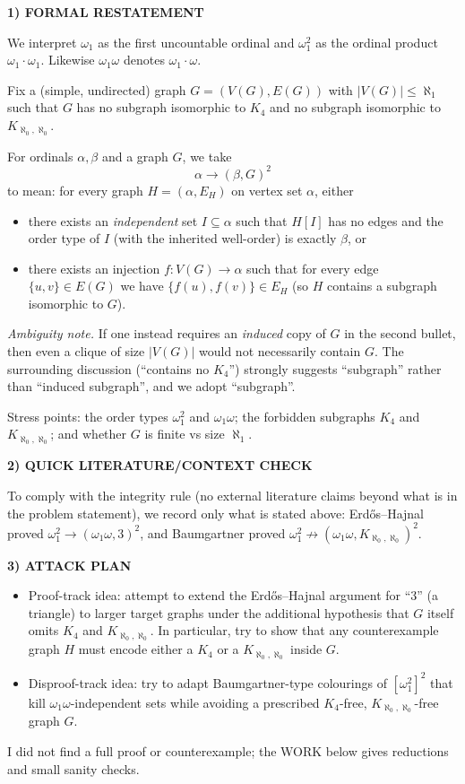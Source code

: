 \noindent\textbf{1) FORMAL RESTATEMENT}\par
We interpret $\omega_1$ as the first uncountable ordinal and $\omega_1^2$ as the ordinal product $\omega_1\cdot\omega_1$. Likewise $\omega_1\omega$ denotes $\omega_1\cdot\omega$.

Fix a (simple, undirected) graph $G=(V(G),E(G))$ with $|V(G)|\le\aleph_1$ such that $G$ has no subgraph isomorphic to $K_4$ and no subgraph isomorphic to $K_{\aleph_0,\aleph_0}$.

For ordinals $\alpha,\beta$ and a graph $G$, we take
\[
\alpha\to(\beta,G)^2
\]
to mean: for every graph $H=(\alpha,E_H)$ on vertex set $\alpha$, either
\begin{itemize}
\item there exists an \emph{independent} set $I\subseteq\alpha$ such that $H[I]$ has no edges and the order type of $I$ (with the inherited well-order) is exactly $\beta$, or
\item there exists an injection $f:V(G)\to\alpha$ such that for every edge $\{u,v\}\in E(G)$ we have $\{f(u),f(v)\}\in E_H$ (so $H$ contains a subgraph isomorphic to $G$).
\end{itemize}

\emph{Ambiguity note.} If one instead requires an \emph{induced} copy of $G$ in the second bullet, then even a clique of size $|V(G)|$ would not necessarily contain $G$. The surrounding discussion (``contains no $K_4$'') strongly suggests ``subgraph'' rather than ``induced subgraph'', and we adopt ``subgraph''.

Stress points: the order types $\omega_1^2$ and $\omega_1\omega$; the forbidden subgraphs $K_4$ and $K_{\aleph_0,\aleph_0}$; and whether $G$ is finite vs size $\aleph_1$.

\noindent\textbf{2) QUICK LITERATURE/CONTEXT CHECK}\par
To comply with the integrity rule (no external literature claims beyond what is in the problem statement), we record only what is stated above: Erd\H{o}s--Hajnal proved $\omega_1^2\to(\omega_1\omega,3)^2$, and Baumgartner proved $\omega_1^2\not\to(\omega_1\omega,K_{\aleph_0,\aleph_0})^2$.

\noindent\textbf{3) ATTACK PLAN}\par
\begin{itemize}
\item Proof-track idea: attempt to extend the Erd\H{o}s--Hajnal argument for ``3'' (a triangle) to larger target graphs under the additional hypothesis that $G$ itself omits $K_4$ and $K_{\aleph_0,\aleph_0}$. In particular, try to show that any counterexample graph $H$ must encode either a $K_4$ or a $K_{\aleph_0,\aleph_0}$ inside $G$.
\item Disproof-track idea: try to adapt Baumgartner-type colourings of $[\omega_1^2]^2$ that kill $\omega_1\omega$-independent sets while avoiding a prescribed $K_4$-free, $K_{\aleph_0,\aleph_0}$-free graph $G$.
\end{itemize}
I did not find a full proof or counterexample; the WORK below gives reductions and small sanity checks.

